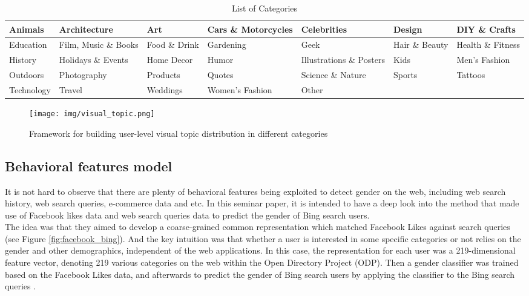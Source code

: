 \documentclass[runningheads]{llncs}
\begin{document}
	\begin{table}
		\caption{List of Categories}
		\hskip-2.5cm \begin{tabular}{| l | l | l | l | l | l | l | }
			\hline
			Animals & Architecture
			& Art & Cars \& Motorcycles & Celebrities
			& Design
			& DIY \& Crafts \\
			\hline
			Education & Film, Music \& Books & 
			Food \& Drink  & Gardening & Geek
			& Hair \& Beauty
			& Health \& Fitness \\
			\hline
			History & Holidays \& Events
			& Home Decor &  Humor & Illustrations \& Posters
			& Kids
			& Men’s Fashion \\
			\hline
			Outdoors & Photography
			& Products
			& Quotes & Science \& Nature
			& Sports
			& Tattoos \\
			\hline
			Technology & Travel
			& Weddings
			& Women’s Fashion & Other & &  \\
			\hline
		\end{tabular}
		\label{table:list-categories}
	\end{table}
	
	\begin{figure}
		\centering
		\texttt{[image: img/visual\_topic.png]}
		\caption{Framework for building user-level visual topic distribution in different categories}
		\label{fig:visual_topic}
	\end{figure}
	
	\subsection{Behavioral features model}
	
	It is not hard to observe that there are plenty of behavioral features being exploited to detect gender on the web, including web search history, web search queries, e-commerce data and etc. In this seminar paper, it is intended to have a deep look into the method that made use of Facebook likes data and web search queries data to predict the gender of Bing search users. \\
	
	The idea was that they aimed to develop a coarse-grained common representation which matched Facebook Likes against search queries (see Figure \ref{fig:facebook_bing}). And the key intuition was that whether a user is interested in some specific categories or not relies on the gender and other demographics, independent of the web applications. In this case, the representation for each user was a 219-dimensional feature vector, denoting 219 various categories on the web within the Open Directory Project (ODP). Then a gender classifier was trained based on the Facebook Likes data, and afterwards to predict the gender of Bing search users by applying the classifier to the Bing search queries \cite{bi2013inferring}. \\
	
\end{document}
